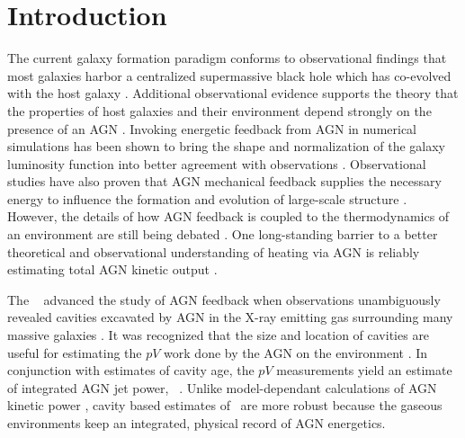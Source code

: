 \documentclass{emulateapj}
\begin{document}


\section{Introduction}
\label{sec:intro}

The current galaxy formation paradigm conforms to observational
findings that most galaxies harbor a centralized supermassive black
hole which has co-evolved with the host galaxy
\citep{1995ARA&A..33..581K, magorrian}. Additional observational
evidence supports the theory that the properties of host galaxies and
their environment depend strongly on the presence of an AGN
\citep[\ie][]{2005MNRAS.362...25B}. Invoking energetic feedback from
AGN in numerical simulations has been shown to bring the shape and
normalization of the galaxy luminosity function into better agreement
with observations \citep{croton06, bower06, saro06,
  sijacki07}. Observational studies have also proven that AGN
mechanical feedback supplies the necessary energy to influence the
formation and evolution of large-scale structure \citep{birzan04,
  2005MNRAS.364.1343D, rafferty06, dunn08, birzan08}. However, the
details of how AGN feedback is coupled to the thermodynamics of an
environment are still being debated \citep{2008ASPC..386..343D,
  2009arXiv0910.3691M}. One long-standing barrier to a better
theoretical and observational understanding of heating via AGN is
reliably estimating total AGN kinetic output
\citep[\eg][]{1991Natur.349..138R, 1996AJ....112....9L}.

The \cxo\ \citep{chandra} advanced the study of AGN feedback when
observations unambiguously revealed cavities excavated by AGN in the
X-ray emitting gas surrounding many massive galaxies
\citep[\eg][]{2000ApJ...534L.135M, perseus1, schindler01}. It was
recognized that the size and location of cavities are useful for
estimating the $pV$ work done by the AGN on the environment
\citep{2000ApJ...534L.135M}. In conjunction with estimates of cavity
age, the $pV$ measurements yield an estimate of integrated AGN jet
power, \pjet\ \citep[see][for a review]{mcnamrev}. Unlike
model-dependant calculations of AGN kinetic power
\citep[\eg][]{1999MNRAS.309.1017W}, cavity based estimates of
\pjet\ are more robust because the gaseous environments keep an
integrated, physical record of AGN energetics.
\end{document}
